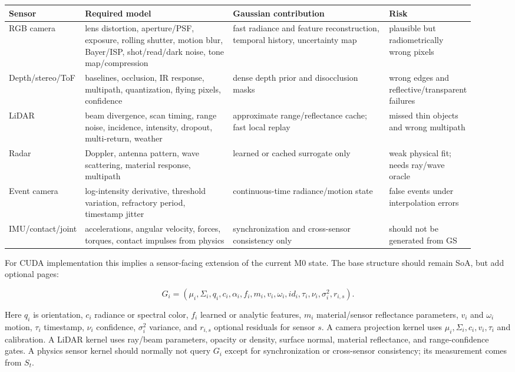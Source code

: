 \documentclass[11pt]{article}
\begin{document}
\begin{center}
\scriptsize
\begin{tabular}{p{0.12\linewidth}p{0.34\linewidth}p{0.36\linewidth}p{0.10\linewidth}}
\toprule
Sensor & Required model & Gaussian contribution & Risk \\
\midrule
RGB camera & lens distortion, aperture/PSF, exposure, rolling shutter, motion blur, Bayer/ISP, shot/read/dark noise, tone map/compression & fast radiance and feature reconstruction, temporal history, uncertainty map & plausible but radiometrically wrong pixels \\
Depth/stereo/ToF & baselines, occlusion, IR response, multipath, quantization, flying pixels, confidence & dense depth prior and disocclusion masks & wrong edges and reflective/transparent failures \\
LiDAR & beam divergence, scan timing, range noise, incidence, intensity, dropout, multi-return, weather & approximate range/reflectance cache; fast local replay & missed thin objects and wrong multipath \\
Radar & Doppler, antenna pattern, wave scattering, material response, multipath & learned or cached surrogate only & weak physical fit; needs ray/wave oracle \\
Event camera & log-intensity derivative, threshold variation, refractory period, timestamp jitter & continuous-time radiance/motion state & false events under interpolation errors \\
IMU/contact/joint & accelerations, angular velocity, forces, torques, contact impulses from physics & synchronization and cross-sensor consistency only & should not be generated from GS \\
\bottomrule
\end{tabular}
\end{center}

For CUDA implementation this implies a sensor-facing extension of the current
M0 state. The base structure should remain SoA, but add optional pages:

\[
  G_i = (\mu_i, \Sigma_i, q_i, c_i, \alpha_i, f_i, m_i, v_i, \omega_i,
         id_i, \tau_i, \nu_i, \sigma_i^2, r_{i,s}).
\]

Here $q_i$ is orientation, $c_i$ radiance or spectral color, $f_i$ learned or
analytic features, $m_i$ material/sensor reflectance parameters, $v_i$ and
$\omega_i$ motion, $\tau_i$ timestamp, $\nu_i$ confidence, $\sigma_i^2$
variance, and $r_{i,s}$ optional residuals for sensor $s$. A camera projection
kernel uses $\mu_i,\Sigma_i,c_i,v_i,\tau_i$ and calibration. A LiDAR kernel uses
ray/beam parameters, opacity or density, surface normal, material reflectance,
and range-confidence gates. A physics sensor kernel should normally not query
$G_i$ except for synchronization or cross-sensor consistency; its measurement
comes from $S_t$.
\end{document}

